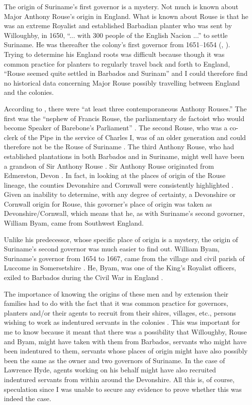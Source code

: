 The origin of Suriname's first governor is a mystery. Not much is known about Major Anthony Rouse's origin in England. What is known about Rouse is that he was an extreme Royalist and established Barbadian planter who was sent by Willoughby, in 1650, ``... with 300 people of the English Nacion ...'' to settle Suriname. He was thereafter the colony's first governor from 1651--1654 (\citealt[198]{Bridenbaugh72}, \citealt[262]{Heywood07}). Trying to determine his England roots was difficult because though it was common practice for planters to regularly travel back and forth to England, ``Rouse seemed quite settled in Barbados and Surinam'' \citep{Roper07} and I could therefore find no historical data concerning Major Rouse possibly travelling between England and the colonies.

According to \citet[195--197]{Roper07}, there were ``at least three contemporaneous Anthony Rouses.'' The first was the ``nephew of Francis Rouse, the parliamentary de factoist who would become Speaker of Barebone's Parliament'' \citep[195]{Roper07}. The second Rouse, who was a co-clerk of the Pipe in the service of Charles I, was of an older generation and could therefore not be the Rouse of Suriname \citep{Roper07}. The third Anthony Rouse, who had established plantations in both Barbados and in Suriname\citep{Roper07}, might well have been a grandson of Sir Anthony Rouse \citep{rhs24}. Sir Anthony Rouse originated from Edmerston, Devon \citep{Burke38}. In fact, in looking at the places of origin of the Rouse lineage, the counties Devonshire and Cornwall were consistently highlighted  \citep{Burke38}. Given an inability to determine, with any degree of certainty, a Devonshire or Cornwall origin for Rouse, this govorner's place of origin was taken as Devonshire/Cornwall, which means that he, as with Suriname's second govorner, William Byam, came from Southwest England.

Unlike his predecessor, whose specific place of origin is a mystery, the origin of Suriname's second governor was much easier to find out. William Byam, Suriname's governor from 1654 to 1667, came from the village and civil parish of Luccome in Somersetshire \citep{Paravisini96}. He, Byam, was one of the King's Royalist officers, exiled to Barbados during the Civil War in England \citep{Paravisini96}.

The importance of knowing the origins of these men and by extension their families had to do with the fact that it was common practice for governors, planters and/or their agents to recruit from their shires, villages, etc., persons wishing to work as indentured servants in the colonies \citep{Bridenbaugh68, Beckles89,  Menard06}. This was important for me to know because it meant that there was a possibility that Willoughby, Rouse and Byam, might have taken with them from Barbados, servants who might have been indentured to them, servants whose places of origin might have also possibly been the same as the owner and two governors of Suriname. In the case of Lawrence Hyde, agents working on his behalf might have also recruited indentured servants from within around the Devonshire. All this is, of course, speculation since I was unable to secure any evidence to prove whether this was indeed the case.

